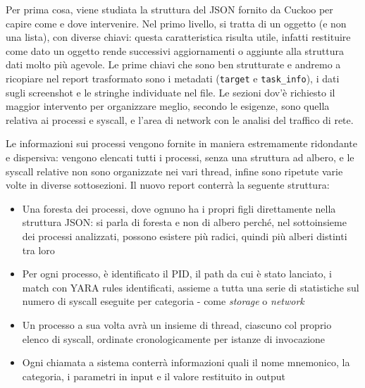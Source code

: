 Per prima cosa, viene studiata la struttura del JSON fornito da Cuckoo per capire come e dove intervenire. Nel primo livello, si tratta di un oggetto (e non una lista), con diverse chiavi: questa caratteristica risulta utile, infatti restituire come dato un oggetto rende successivi aggiornamenti o aggiunte alla struttura dati molto più agevole.
Le prime chiavi che sono ben strutturate e andremo a ricopiare nel report trasformato sono i metadati (\texttt{target} e \texttt{task\_info}), i dati sugli screenshot e le stringhe individuate nel file.
Le sezioni dov'è richiesto il maggior intervento per organizzare meglio, secondo le esigenze, sono quella relativa ai processi e syscall, e l'area di network con le analisi del traffico di rete.

Le informazioni sui processi vengono fornite in maniera estremamente ridondante e dispersiva: vengono elencati tutti i processi, senza una struttura ad albero, e le syscall relative non sono organizzate nei vari thread, infine sono ripetute varie volte in diverse sottosezioni.
Il nuovo report conterrà la seguente struttura:
\begin{itemize}
    \item Una foresta dei processi, dove ognuno ha i propri figli direttamente nella struttura JSON: si parla di foresta e non di albero perché, nel sottoinsieme dei processi analizzati, possono esistere più radici, quindi più alberi distinti tra loro
    \item Per ogni processo, è identificato il PID, il path da cui è stato lanciato, i match con YARA rules identificati, assieme a tutta una serie di statistiche sul numero di syscall eseguite per categoria - come \emph{storage} o \emph{network}
    \item Un processo a sua volta avrà un insieme di thread, ciascuno col proprio elenco di syscall, ordinate cronologicamente per istanze di invocazione
    \item Ogni chiamata a sistema conterrà informazioni quali il nome mnemonico, la categoria, i parametri in input e il valore restituito in output
\end{itemize}

